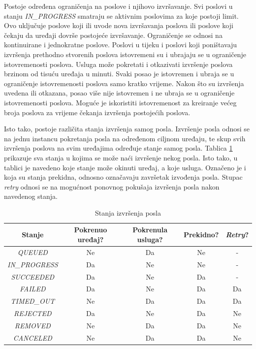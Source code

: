 Postoje određena ograničenja na poslove i njihovo izvršavanje. Svi poslovi u stanju \textit{IN\_PROGRESS} smatraju se aktivnim poslovima za koje postoji limit. Ovo uključuje poslove koji ili uvode nova izvršavanja poslova ili poslove koji čekaju da uređaji dovrše postojeće izvršavanje. Ograničenje se odnosi na kontinuirane i jednokratne poslove. Poslovi u tijeku i poslovi koji poništavaju izvršenja prethodno stvorenih poslova istovremeni su i ubrajaju se u ograničenje istovremenosti poslova. Usluga može pokretati i otkazivati izvršenje poslova brzinom od tisuću uređaja u minuti. Svaki posao je istovremen i ubraja se u ograničenje istovremenosti poslova samo kratko vrijeme. Nakon što su izvršenja uvedena ili otkazana, posao više nije istovremen i ne ubraja se u ograničenje istovremenosti poslova. Moguće je iskoristiti istovremenost za kreiranje većeg broja poslova za vrijeme čekanja izvršenja postojećih poslova.

Isto tako, postoje različita stanja izvršenja samog posla. Izvršenje posla odnosi se na jednu instancu pokretanja posla na određenom ciljnom uređaju, te skup svih izvršenja poslova na svim uređajima određuje stanje samog posla. Tablica \ref{table:job_exec_states} prikazuje sva stanja u kojima se može naći izvršenje nekog posla. Isto tako, u tablici je navedeno koje stanje može okinuti uređaj, a koje usluga. Označeno je i koja su stanja prekidna, odnosno označavaju završetak izvođenja posla. Stupac \textit{retry} odnosi se na mogućnost ponovnog pokušaja izvršenja posla nakon navedenog stanja. 

\begin{table}[ht!]
	\centering
	\caption{Stanja izvršenja posla \cite{aws_docs}}
	\begin{tabular}{|c| c| c| c| c|}
		\hline
		\rowcolor{lightblue}  
		\textbf{Stanje} & \textbf{Pokrenuo uređaj?} & \textbf{Pokrenula usluga?} & \textbf{Prekidno?} & \textbf{\textit{Retry}?} \\ \hline
		\textit{QUEUED} & Ne & Da & Ne & - \\ \hline
		\textit{IN\_PROGRESS} & Da & Ne & Ne & - \\ \hline
		\textit{SUCCEEDED} & Da & Ne & Da & - \\ \hline
		\textit{FAILED} & Da & Ne & Da & Da \\ \hline
		\textit{TIMED\_OUT} & Ne & Da & Da & Da \\ \hline
		\textit{REJECTED} & Da & Ne & Da & Ne \\ \hline
		\textit{REMOVED} & Ne & Da & Da & Ne \\ \hline
		\textit{CANCELED} & Ne & Da & Da & Ne \\ \hline
	\end{tabular}
	\label{table:job_exec_states}
\end{table}

